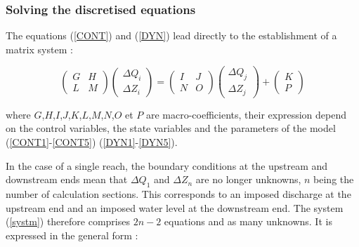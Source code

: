 \subsubsection{Solving the discretised equations}

The equations (\ref{CONT}) and (\ref{DYN}) lead directly to the establishment of a matrix system :

\begin{equation}
 \label{systm}
 \left(
    \begin{array}{cc}
       G & H \\
       L & M
    \end{array}
 \right)
 \left(
    \begin{array}{c}
       \Delta Q_i \\
       \Delta Z_i
    \end{array}
 \right)
 =
  \left(
    \begin{array}{cc}
       I & J \\
       N & O
    \end{array}
 \right)
 \left(
    \begin{array}{c}
       \Delta Q_j \\
       \Delta Z_j
    \end{array}
 \right)
 +
 \left(
    \begin{array}{c}
       K \\
       P
    \end{array}
 \right)
\end{equation}

where $G$,$H$,$I$,$J$,$K$,$L$,$M$,$N$,$O$ et $P$ are macro-coefficients, their expression
depend on the control variables, the state variables and the parameters of the model (\ref{CONT1}-\ref{CONT5}) (\ref{DYN1}-\ref{DYN5}).

In the case of a single reach, the boundary conditions at the upstream and downstream ends mean that $\Delta Q_1$ and $\Delta Z_n$ are no longer unknowns, $n$ being the number of calculation sections. This corresponds to an imposed discharge at the upstream end and an imposed water level at the downstream end. The system (\ref{systm}) therefore comprises $2n-2$ equations and as many unknowns. It is expressed in the general form :

